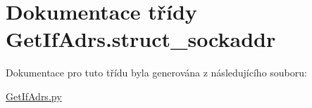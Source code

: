 \hypertarget{classGetIfAdrs_1_1struct__sockaddr}{\section{Dokumentace třídy Get\-If\-Adrs.\-struct\-\_\-sockaddr}
\label{d6/dba/classGetIfAdrs_1_1struct__sockaddr}
}


Dokumentace pro tuto třídu byla generována z následujícího souboru\-:\begin{DoxyCompactItemize}
\item 
\hyperlink{GetIfAdrs_8py}{Get\-If\-Adrs.\-py}\end{DoxyCompactItemize}
